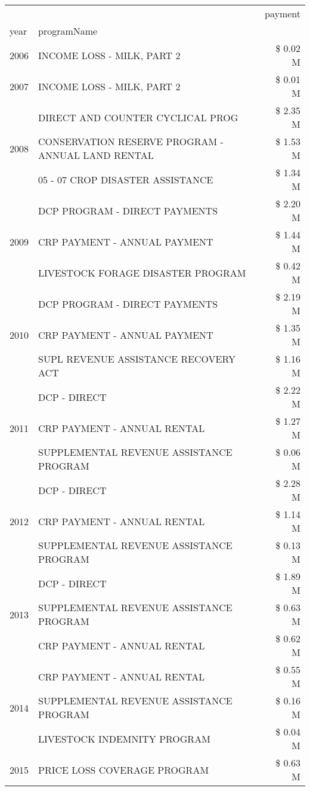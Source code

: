 \begin{tabular}{llr}
\toprule
 &  & payment \\
year & programName &  \\
\midrule
2006 & INCOME LOSS - MILK, PART 2 & \$ 0.02 M \\
\cline{1-3}
2007 & INCOME LOSS - MILK, PART 2 & \$ 0.01 M \\
\cline{1-3}
\multirow[t]{3}{*}{2008} & DIRECT AND COUNTER CYCLICAL PROG & \$ 2.35 M \\
 & CONSERVATION RESERVE PROGRAM - ANNUAL LAND RENTAL & \$ 1.53 M \\
 & 05 - 07 CROP DISASTER ASSISTANCE & \$ 1.34 M \\
\cline{1-3}
\multirow[t]{3}{*}{2009} & DCP PROGRAM - DIRECT PAYMENTS & \$ 2.20 M \\
 & CRP PAYMENT - ANNUAL PAYMENT & \$ 1.44 M \\
 & LIVESTOCK FORAGE DISASTER  PROGRAM & \$ 0.42 M \\
\cline{1-3}
\multirow[t]{3}{*}{2010} & DCP PROGRAM - DIRECT PAYMENTS & \$ 2.19 M \\
 & CRP PAYMENT - ANNUAL PAYMENT & \$ 1.35 M \\
 & SUPL REVENUE ASSISTANCE RECOVERY ACT & \$ 1.16 M \\
\cline{1-3}
\multirow[t]{3}{*}{2011} & DCP - DIRECT & \$ 2.22 M \\
 & CRP PAYMENT - ANNUAL RENTAL & \$ 1.27 M \\
 & SUPPLEMENTAL REVENUE ASSISTANCE PROGRAM & \$ 0.06 M \\
\cline{1-3}
\multirow[t]{3}{*}{2012} & DCP - DIRECT & \$ 2.28 M \\
 & CRP PAYMENT - ANNUAL RENTAL & \$ 1.14 M \\
 & SUPPLEMENTAL REVENUE ASSISTANCE PROGRAM & \$ 0.13 M \\
\cline{1-3}
\multirow[t]{3}{*}{2013} & DCP - DIRECT & \$ 1.89 M \\
 & SUPPLEMENTAL REVENUE ASSISTANCE PROGRAM & \$ 0.63 M \\
 & CRP PAYMENT - ANNUAL RENTAL & \$ 0.62 M \\
\cline{1-3}
\multirow[t]{3}{*}{2014} & CRP PAYMENT - ANNUAL RENTAL & \$ 0.55 M \\
 & SUPPLEMENTAL REVENUE ASSISTANCE PROGRAM & \$ 0.16 M \\
 & LIVESTOCK INDEMNITY PROGRAM & \$ 0.04 M \\
\cline{1-3}
\multirow[t]{3}{*}{2015} & PRICE LOSS COVERAGE PROGRAM & \$ 0.63 M \\

\end{tabular}
